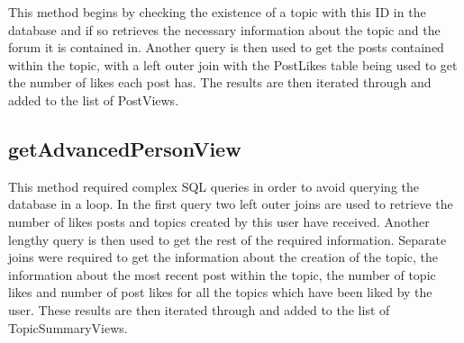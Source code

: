 \documentclass{article}
\begin{document}
This method begins by checking the existence of a topic with this ID in the database and if so retrieves the necessary information about the topic and the forum it is contained in. Another query is then used to get the posts contained within the topic, with a left outer join with the PostLikes table being used to get the number of likes each post has. The results are then iterated through and added to the list of PostViews.

\subsection*{getAdvancedPersonView}

This method required complex SQL queries in order to avoid querying the database in a loop. In the first query two left outer joins are used to retrieve the number of likes posts and topics created by this user have received. Another lengthy query is then used to get the rest of the required information. Separate joins were required to get the information about the creation of the topic, the information about the most recent post within the topic, the number of topic likes and number of post likes for all the topics which have been liked by the user. These results are then iterated through and added to the list of TopicSummaryViews.
\end{document}
